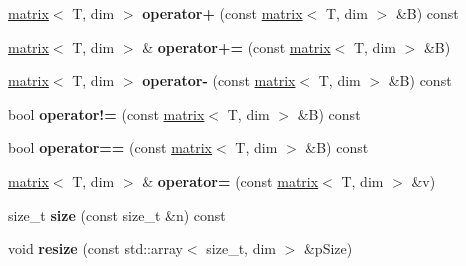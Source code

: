 \begin{DoxyCompactItemize}
\item 
\hypertarget{classkeycpp_1_1matrix_ada7a8a25fb314072a6bc59ed7bda8867}{\hyperlink{classkeycpp_1_1matrix}{matrix}$<$ T, dim $>$ {\bfseries operator+} (const \hyperlink{classkeycpp_1_1matrix}{matrix}$<$ T, dim $>$ \&B) const }\label{classkeycpp_1_1matrix_ada7a8a25fb314072a6bc59ed7bda8867}

\item 
\hypertarget{classkeycpp_1_1matrix_a2eebddb2db3156a8d05fe0baf9fc396e}{\hyperlink{classkeycpp_1_1matrix}{matrix}$<$ T, dim $>$ \& {\bfseries operator+=} (const \hyperlink{classkeycpp_1_1matrix}{matrix}$<$ T, dim $>$ \&B)}\label{classkeycpp_1_1matrix_a2eebddb2db3156a8d05fe0baf9fc396e}

\item 
\hypertarget{classkeycpp_1_1matrix_a8656b3861c657c6425c226ed8581a2da}{\hyperlink{classkeycpp_1_1matrix}{matrix}$<$ T, dim $>$ {\bfseries operator-\/} (const \hyperlink{classkeycpp_1_1matrix}{matrix}$<$ T, dim $>$ \&B) const }\label{classkeycpp_1_1matrix_a8656b3861c657c6425c226ed8581a2da}

\item 
\hypertarget{classkeycpp_1_1matrix_aeff29be0826cee275df82ce9e109873f}{bool {\bfseries operator!=} (const \hyperlink{classkeycpp_1_1matrix}{matrix}$<$ T, dim $>$ \&B) const }\label{classkeycpp_1_1matrix_aeff29be0826cee275df82ce9e109873f}

\item 
\hypertarget{classkeycpp_1_1matrix_a81a97884f2b968ecc48a44c057a4d018}{bool {\bfseries operator==} (const \hyperlink{classkeycpp_1_1matrix}{matrix}$<$ T, dim $>$ \&B) const }\label{classkeycpp_1_1matrix_a81a97884f2b968ecc48a44c057a4d018}

\item 
\hypertarget{classkeycpp_1_1matrix_a0e46bd1a6676c8f43e18c4090db04f06}{\hyperlink{classkeycpp_1_1matrix}{matrix}$<$ T, dim $>$ \& {\bfseries operator=} (const \hyperlink{classkeycpp_1_1matrix}{matrix}$<$ T, dim $>$ \&v)}\label{classkeycpp_1_1matrix_a0e46bd1a6676c8f43e18c4090db04f06}

\item 
\hypertarget{classkeycpp_1_1matrix_aae976395cf7fa4eea95deb475e3fe085}{size\-\_\-t {\bfseries size} (const size\-\_\-t \&n) const }\label{classkeycpp_1_1matrix_aae976395cf7fa4eea95deb475e3fe085}

\item 
\hypertarget{classkeycpp_1_1matrix_ad0abc30bb7fc8a2bd0e8998b954a4e65}{void {\bfseries resize} (const std\-::array$<$ size\-\_\-t, dim $>$ \&p\-Size)}\label{classkeycpp_1_1matrix_ad0abc30bb7fc8a2bd0e8998b954a4e65}


\end{DoxyCompactItemize}
